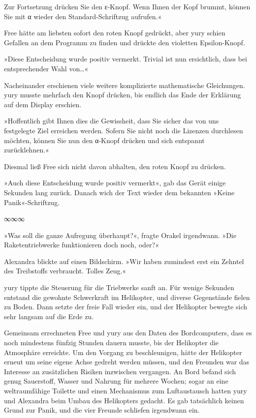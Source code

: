 Zur Fortsetzung drücken Sie den ε-Knopf. Wenn Ihnen der Kopf brummt, können Sie mit α wieder den Standard-Schriftzug aufrufen.«

Free hätte am liebsten sofort den roten Knopf gedrückt, aber yury schien Gefallen an dem Programm zu finden und drückte den violetten Epsilon-Knopf.

»Diese Entscheidung wurde positiv vermerkt. Trivial ist nun ersichtlich, dass bei entsprechender Wahl von…«

Nacheinander erschienen viele weitere komplizierte mathematische Gleichungen. yury musste mehrfach den Knopf drücken, bis endlich das Ende der Erklärung auf dem Display erschien.

»Hoffentlich gibt Ihnen dies die Gewissheit, dass Sie sicher das von uns festgelegte Ziel erreichen werden. Sofern Sie nicht noch die Lizenzen durchlesen möchten, können Sie nun den α-Knopf drücken und sich entspannt zurücklehnen.«

Diesmal ließ Free sich nicht davon abhalten, den roten Knopf zu drücken.

»Auch diese Entscheidung wurde positiv vermerkt«, gab das Gerät einige Sekunden lang zurück. Danach wich der Text wieder dem bekannten »Keine Panik«-Schriftzug.

\begin{center}
    ∞∞∞
\end{center}

»Was soll die ganze Aufregung überhaupt?«, fragte Orakel irgendwann. »Die Raketentriebwerke funktionieren doch noch, oder?«

Alexandra blickte auf einen Bildschirm. »Wir haben zumindest erst ein Zehntel des Treibstoffs verbraucht. Tolles Zeug.«

yury tippte die Steuerung für die Triebwerke sanft an. Für wenige Sekunden entstand die gewohnte Schwerkraft im Helikopter, und diverse Gegenstände fielen zu Boden. Dann setzte der freie Fall wieder ein, und der Helikopter bewegte sich sehr langsam auf die Erde zu.

Gemeinsam errechneten Free und yury aus den Daten des Bordcomputers, dass es noch mindestens fünfzig Stunden dauern musste, bis der Helikopter die Atmosphäre erreichte. Um den Vorgang zu beschleunigen, hätte der Helikopter erneut um seine eigene Achse gedreht werden müssen, und den Freunden war das Interesse an zusätzlichen Risiken inzwischen vergangen. An Bord befand sich genug Sauerstoff, Wasser und Nahrung für mehrere Wochen; sogar an eine weltraumfähige Toilette und einen Mechanismus zum Luftaustausch hatten yury und Alexandra beim Umbau des Helikopters gedacht. Es gab tatsächlich keinen Grund zur Panik, und die vier Freunde schliefen irgendwann ein.


